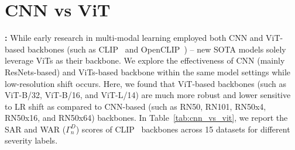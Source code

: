 \section{CNN vs ViT}
\textbf{:} While early research in multi-modal learning employed both CNN and ViT-based backbones (such as CLIP~\cite{radford2021learning} and OpenCLIP~\cite{ilharco_gabriel_2021_5143773}) -- new SOTA models solely leverage ViTs as their backbone. We explore the effectiveness of CNN (mainly ResNets-based) and ViTs-based backbone within the same model settings while low-resolution shift occurs. Here, we found that ViT-based backbones (such as ViT-B/32, ViT-B/16, and ViT-L/14) are much more robust and lower sensitive to LR shift as compared to CNN-based (such as RN50, RN101, RN50x4, RN50x16, and RN50x64) backbones. In Table~\ref{tab:cnn_vs_vit}, we report the SAR and WAR ($\Gamma^{D}_{n}$) scores of CLIP~\cite{radford2021learning} backbones across 15 datasets for different severity labels.


